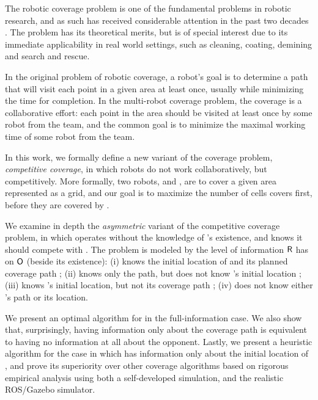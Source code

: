 The robotic coverage problem is one of the fundamental problems in robotic research, and as such has received considerable attention in the past two decades \cite{galceran2013survey,choset2001coverage}. The problem has its theoretical merits, but is of special interest due to its immediate applicability in real world settings, such as cleaning, coating, demining and search and rescue. 

In the original problem of robotic coverage, a robot's goal is to determine a path that will visit each point in a given area at least once, usually while minimizing the time for completion. %
In the multi-robot coverage problem, the coverage is a collaborative effort: each point in the area should be visited at least once by some robot from the team, and the common goal is to minimize the maximal working time of some robot from the team. 

In this work, we formally define a new variant of the coverage problem, {\em competitive coverage}, in which robots do not work collaboratively, but competitively. More formally, two robots, \rob and \opp, are to cover a given area represented as a grid, and our goal is to maximize the number of cells \rob covers first, before they are covered by \opp.

We examine in depth the {\em asymmetric} variant of the competitive coverage problem, in which \opp operates without the knowledge of \rob's existence, and \rob knows it should compete with \opp. The problem is modeled by the level of information ${{\sf R}}$ has on ${{\sf O}}$ (beside its existence): %
(i) \rob knows the initial location of \opp and its planned coverage path ; (ii) \rob knows only the path, but does not know \opp's initial location ; (iii) \rob knows \opp's initial location, but not its coverage path ; (iv) \rob does not know either \opp's path or its location.


We present an optimal algorithm for \rob in the full-information case. We also show that, surprisingly, having information only about the coverage path is equivalent to having no information at all about the opponent. Lastly, we present a heuristic algorithm for the case in which \rob has information only about the initial location of \opp, and prove its superiority over other coverage algorithms based on rigorous empirical analysis using both a self-developed simulation, and the realistic ROS/Gazebo simulator.